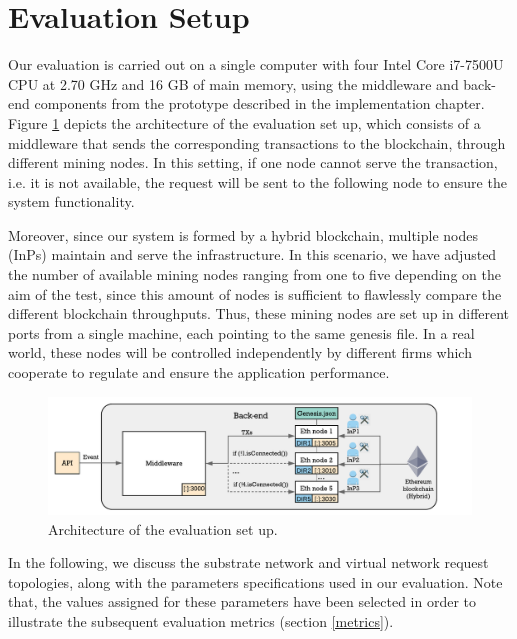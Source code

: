 \section{Evaluation Setup}

Our evaluation is carried out on a single computer with four Intel Core i7-7500U CPU at 2.70 GHz and 16 GB of main memory, using the middleware and back-end components from the prototype described in the implementation chapter. Figure \ref{fig:ev_scenario} depicts the architecture of the evaluation set up, which consists of a middleware that sends the corresponding transactions to the blockchain, through different mining nodes. In this setting, if one node cannot serve the transaction, i.e. it is not available, the request will be sent to the following node to ensure the system functionality.

Moreover, since our system is formed by a hybrid blockchain, multiple nodes (InPs) maintain and serve the infrastructure. In this scenario, we have adjusted the number of available mining nodes ranging from one to five depending on the aim of the test, since this amount of nodes is sufficient to flawlessly compare the different blockchain throughputs. Thus, these mining nodes are set up in different ports from a single machine, each pointing to the same genesis file. In a real world, these nodes will be controlled independently by different firms which cooperate to regulate and ensure the application performance.

\begin{figure}[bth]
	\centering
	\includegraphics[width=1\linewidth]{gfx/Evaluation_scenario}    
  	\caption{Architecture of the evaluation set up.}
  	\label{fig:ev_scenario}
\end{figure}

In the following, we discuss the substrate network and virtual network request topologies, along with the parameters specifications used in our evaluation. Note that, the values assigned for these parameters have been selected in order to illustrate the subsequent evaluation metrics (section \ref{metrics}).

